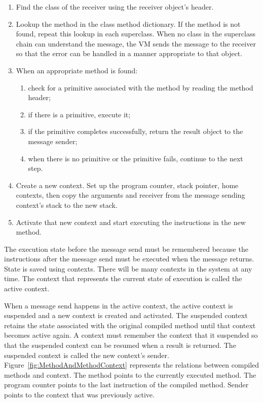 \documentclass[a4paper,10pt,twoside]{book}
\begin{document}
\begin{enumerate}

\item Find the class of the receiver using the receiver object's
  header.

\item Lookup the method in the class method dictionary. If the method
  is not found, repeat this lookup in each superclass. When no class
  in the superclass chain can understand the message, the VM sends the
  message  to the receiver so that the error
  can be handled in a manner appropriate to that object.

\item When an appropriate method is found:

  \begin{enumerate}
  \item check for a primitive associated with the method by reading
    the method header;
  \item if there is a primitive, execute it;
  \item if the primitive completes successfully, return the result object
    to the message sender;
  \item when there is no primitive or the primitive fails, continue to
    the next step.
  \end{enumerate}

\item Create a new context. Set up the program counter, stack pointer,
  home contexts, then copy the arguments and receiver from the message
  sending context's stack to the new stack.

\item Activate that new context and start executing the instructions
  in the new method.
\end{enumerate}

The execution state before the message send must be remembered because
the instructions after the message send must be executed when the
message returns. State is saved using contexts. There will
be many contexts in the system at any time. The context that
represents the current state of execution is called the active
context.

When a message send happens in the active context, the active context
is suspended and a new context is created and activated. The
suspended context retains the state associated with the original
compiled method until that context becomes active again. A context
must remember the context that it suspended so that the suspended
context can be resumed when a result is returned. The suspended
context is called the new context's sender. Figure~\ref{fig:MethodAndMethodContext}
represents the relations between compiled methods and context. The method points to the currently executed method. The program counter points
to the last instruction of the compiled method. Sender points to the context that was previously active.  
\end{document}
